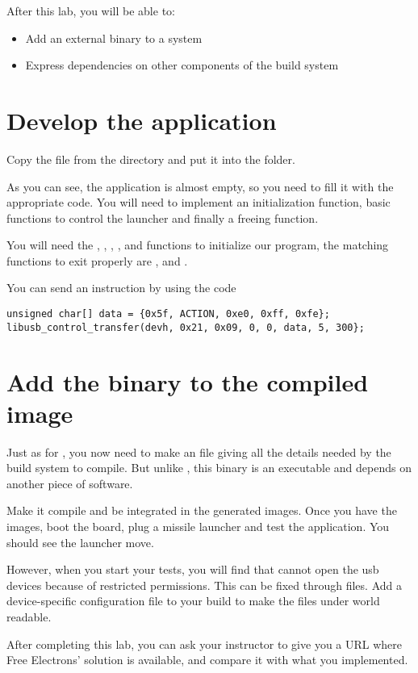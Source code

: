 
After this lab, you will be able to:
\begin{itemize}
  \item Add an external binary to a system
  \item Express dependencies on other components of the build system
\end{itemize}

\section{Develop the application}

Copy the  file from the
 directory and put it
into the  folder.

As you can see, the application is almost empty, so you need to fill
it with the appropriate code. You will need to implement an
initialization function, basic functions to control the launcher and
finally a freeing function.

You will need the , ,
, ,
 and 
functions to initialize our program, the matching functions to exit
properly are , 
and .

You can send an instruction by using the code
\begin{lstlisting}
unsigned char[] data = {0x5f, ACTION, 0xe0, 0xff, 0xfe};
libusb_control_transfer(devh, 0x21, 0x09, 0, 0, data, 5, 300};
\end{lstlisting}

\section{Add the binary to the compiled image}

Just as for , you now need to make an  file
giving all the details needed by the build system to compile. But
unlike , this binary is an executable and depends on another
piece of software.

Make it compile and be integrated in the generated images. Once you
have the images, boot the board, plug a missile launcher and test the
application. You should see the launcher move.

However, when you start your tests, you will find that  cannot open
the usb devices because of restricted permissions. This can be fixed
through  files. Add a device-specific 
configuration file to your build to make the files under
 world readable.

After completing this lab, you can ask your instructor to
give you a URL where Free Electrons' solution is available, and compare
it with what you implemented.
